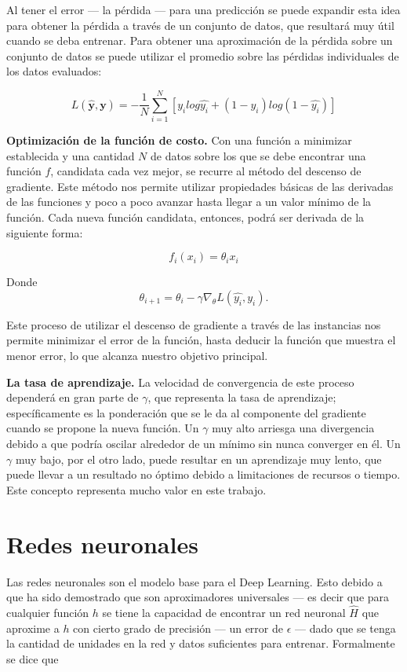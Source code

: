 Al tener el error --- la pérdida --- para una predicción se puede expandir esta idea para obtener la pérdida a través de un conjunto de datos, que resultará muy útil cuando se deba entrenar. Para obtener una aproximación de la pérdida sobre un conjunto de datos se puede utilizar el promedio sobre las pérdidas individuales de los datos evaluados:

\[ L(\mathbf{\hat{y}}, \mathbf{y}) = - \frac{1}{N} \sum_{i = 1}^{N} [y_i log\hat{y_i} + (1 - y_i)log(1 - \hat{y_i})] \]

\textbf{Optimización de la función de costo.} Con una función a minimizar establecida y una cantidad $N$ de datos sobre los que se debe encontrar una función $f$, candidata cada vez mejor, se recurre al método del descenso de gradiente. Este método nos permite utilizar propiedades básicas de las derivadas de las funciones y poco a poco avanzar hasta llegar a un valor mínimo de la función. Cada nueva función candidata, entonces, podrá ser derivada de la siguiente forma:

\[ f_i(x_i) = \theta_i x_i \]

Donde
\begin{equation}
\label{eq:sgdupdate}
\theta_{i + 1} = \theta_{i} - \gamma \nabla_{\theta} L(\hat{y_i}, y_i).
\end{equation}

Este proceso de utilizar el descenso de gradiente a través de las instancias nos permite  minimizar el error de la función, hasta deducir la función que muestra el menor error, lo que alcanza nuestro objetivo principal.

\textbf{La \gls{tasa de aprendizaje}.} La velocidad de convergencia de este proceso dependerá en gran parte de $\gamma$, que representa la tasa de aprendizaje; específicamente es la ponderación que se le da al componente del gradiente cuando se propone la nueva función. Un $\gamma$ muy alto arriesga una divergencia debido a que podría oscilar alrededor de un mínimo sin nunca converger en él. Un $\gamma$ muy bajo, por el otro lado, puede resultar en un aprendizaje muy lento, que puede llevar a un resultado no óptimo debido a limitaciones de recursos o tiempo. Este concepto representa mucho valor en este trabajo.

\section{Redes neuronales}

Las redes neuronales son el modelo base para el Deep Learning. Esto debido a que ha sido demostrado que son aproximadores universales \parencite{hornik1989universal} --- es decir que para cualquier función $h$ se tiene la capacidad de encontrar un red neuronal $\hat{H}$ que aproxime a $h$ con cierto grado de precisión --- un error de $\epsilon$ --- dado que se tenga la cantidad de unidades en la red y datos suficientes para entrenar. Formalmente se dice que

